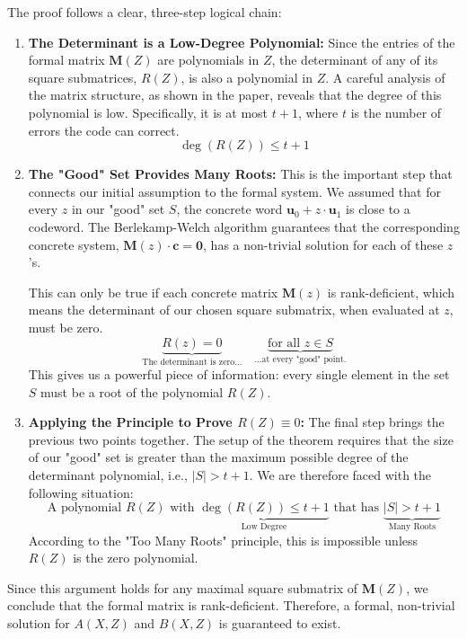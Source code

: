 \documentclass{article}
\begin{document}
The proof follows a clear, three-step logical chain:
\begin{enumerate}
    \item \textbf{The Determinant is a Low-Degree Polynomial:}
    Since the entries of the formal matrix $\mathbf{M}(Z)$ are polynomials in $Z$, the determinant of any of its square submatrices, $R(Z)$, is also a polynomial in $Z$. A careful analysis of the matrix structure, as shown in the paper, reveals that the degree of this polynomial is low. Specifically, it is at most $t+1$, where $t$ is the number of errors the code can correct.
    \[ \deg(R(Z)) \le t+1 \]

    \item \textbf{The "Good" Set Provides Many Roots:}
    This is the important step that connects our initial assumption to the formal system. We assumed that for every $z$ in our "good" set $S$, the concrete word $\mathbf{u}_0 + z \cdot \mathbf{u}_1$ is close to a codeword. The Berlekamp-Welch algorithm guarantees that the corresponding concrete system, $\mathbf{M}(z) \cdot \mathbf{c} = \mathbf{0}$, has a non-trivial solution for each of these $z$'s.

    This can only be true if each concrete matrix $\mathbf{M}(z)$ is rank-deficient, which means the determinant of our chosen square submatrix, when evaluated at $z$, must be zero.
    \[ \underbrace{R(z) = 0}_{\text{The determinant is zero...}} \quad \underbrace{\text{for all } z \in S}_{\text{...at every "good" point.}} \]
    This gives us a powerful piece of information: every single element in the set $S$ must be a root of the polynomial $R(Z)$.

    \item \textbf{Applying the Principle to Prove $R(Z) \equiv 0$:}
    The final step brings the previous two points together. The setup of the theorem requires that the size of our "good" set is greater than the maximum possible degree of the determinant polynomial, i.e., $|S| > t+1$. We are therefore faced with the following situation:
    \[ \text{A polynomial } R(Z) \text{ with } \underbrace{\deg(R(Z)) \le t+1}_{\text{Low Degree}} \text{ that has } \underbrace{|S| > t+1}_{\text{Many Roots}} \]
    According to the "Too Many Roots" principle, this is impossible unless $R(Z)$ is the zero polynomial.
\end{enumerate}
Since this argument holds for any maximal square submatrix of $\mathbf{M}(Z)$, we conclude that the formal matrix is rank-deficient. Therefore, a formal, non-trivial solution for $A(X,Z)$ and $B(X,Z)$ is guaranteed to exist.
\end{document}
